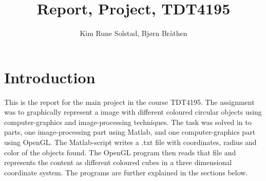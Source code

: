 \documentclass[english, a4paper]{article}
\title{Report, Project, TDT4195}
\author{Kim Rune Solstad, Bjørn Bråthen}
\begin{document}
\maketitle

\section{Introduction}
This is the report for the main project in the course TDT4195. The assignment was to graphically represent a image with different coloured circular objects using computer-graphics and image-processing techniques. The task was solved in to parts, one image-processing part using Matlab, and one computer-graphics part using OpenGL. The Matlab-script writes a .txt file with coordinates, radius and color of the objects found. The OpenGL program then reads that file and represents the content as different coloured cubes in a three dimensional coordinate system. The programs are further explained in the sections below. 




\end{document}

